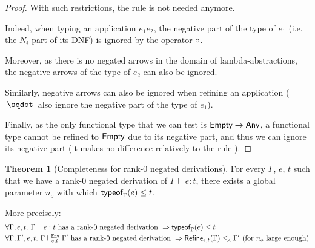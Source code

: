 \documentclass[a4paper]{article}
\theoremstyle{definition}
\newtheorem{theorem}{Theorem}
\begin{document}
  \begin{proof}
    With such restrictions, the rule  is not needed anymore.

    Indeed, when typing an application $e_1 e_2$, the negative part of the type of $e_1$ (i.e. the $N_i$ part of its DNF)
    is ignored by the operator $\circ$.

    Moreover, as there is no negated arrows in the domain of lambda-abstractions,
    the negative arrows of the type of $e_2$ can also be ignored.

    Similarly, negative arrows can also be ignored when refining an application ($\worra {} {}$ also ignore the negative part
    of the type of $e_1$).

    Finally, as the only functional type that we can test is $\textsf{Empty}\to \textsf{Any}$, a functional type
    cannot be refined to $\textsf{Empty}$ due to its negative part, and thus we can ignore its negative part
    (it makes no difference relatively to the rule ).
  \end{proof}

  \begin{theorem}[Completeness for rank-0 negated derivations]
    For every $\Gamma$, $e$, $t$ such that we have a rank-0 negated derivation of $\Gamma \vdash e:t$, there exists a global parameter $n_o$
    with which $\textsf{typeof}_{\Gamma}(e) \leq t$.

    More precisely:
    \begin{align*}
      &\forall \Gamma, e, t.\ \Gamma \vdash e:t \text{ has a rank-0 negated derivation } \Rightarrow \textsf{typeof}_{\Gamma}(e) \leq t\\
      &\forall \Gamma, \Gamma', e, t.\ \Gamma \vdash^{\texttt{Env}}_{e,t} \Gamma' \text{ has a rank-0 negated derivation } \Rightarrow \textsf{Refine}_{e,t}(\Gamma) \leq_{\!\scriptscriptstyle\mathcal{A}} \Gamma' \text{ (for $n_o$ large enough)}
    \end{align*}
  \end{theorem}
\end{document}
